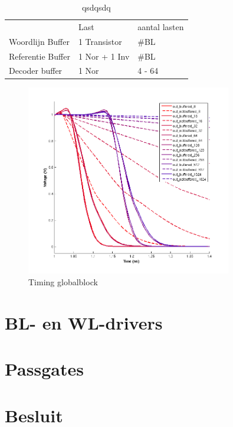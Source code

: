 \begin{table}
\begin{center}
\begin{tabular}{lll}
 & Last & aantal lasten\\
Woordlijn Buffer & 1 Transistor &  \#BL\\
Referentie Buffer & 1 Nor + 1 Inv &  \#BL\\
Decoder buffer & 1 Nor & 4 - 64
\end{tabular}\label{tab:buffer}
\end{center}
\caption{qsdqsdq}
\end{table}

\begin{figure}[h!]
  \centering
  \includegraphics[width=0.8\textwidth]{../fig/hfdst-buffers-refbuffer.png}
  \caption{Timing globalblock}
  \label{fig:refbuffer}
\end{figure}

\section{BL- en WL-drivers}

\section{Passgates}


\section{Besluit}

